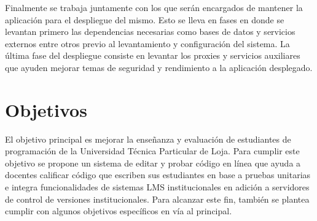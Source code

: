 Finalmente se trabaja juntamente con los que serán encargados de mantener la aplicación para el despliegue del mismo. Esto se lleva en fases en donde se levantan primero las dependencias necesarias como bases de datos y servicios externos entre otros previo al levantamiento y configuración del sistema. La última fase del despliegue consiste en levantar los proxies y servicios auxiliares que ayuden mejorar temas de seguridad y rendimiento a la aplicación desplegado.

\section{Objetivos}
El objetivo principal es mejorar la enseñanza y evaluación de estudiantes de programación de la Universidad Técnica Particular de Loja. Para cumplir este objetivo se propone un sistema de editar y probar código en línea que ayuda a docentes calificar código que escriben sus estudiantes en base a pruebas unitarias e integra funcionalidades de sistemas LMS institucionales en adición a servidores de control de versiones institucionales. Para alcanzar este fin, también se plantea cumplir con algunos objetivos específicos en vía al principal.


